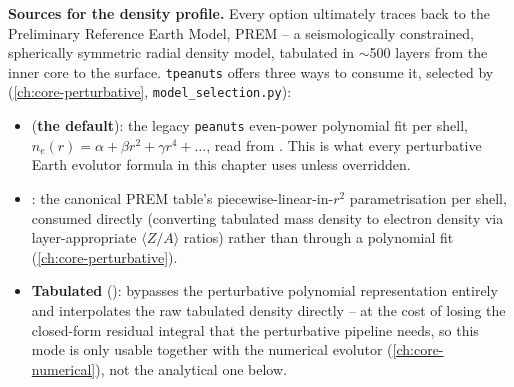 \begin{implbox}
\textbf{Sources for the density profile.} Every option ultimately traces
back to the Preliminary Reference Earth Model, PREM
\parencite{DziewonskiAnderson1981} -- a seismologically constrained,
spherically symmetric radial density model, tabulated in $\sim$500 layers
from the inner core to the surface. \texttt{tpeanuts} offers three ways to
consume it, selected by 
(\cref{ch:core-perturbative}, \texttt{model\_selection.py}):
\begin{itemize}
  \item {} (\textbf{the default}): the legacy
    \texttt{peanuts} even-power polynomial fit per shell,
    $n_e(r)=\alpha+\beta r^2+\gamma r^4+\dots$, read from
    . This is what every perturbative
    Earth evolutor formula in this chapter uses unless overridden.
  \item {}: the canonical PREM table's piecewise-linear-in-$r^2$
    parametrisation per shell, consumed directly (converting tabulated mass
    density to electron density via layer-appropriate $\langle Z/A\rangle$
    ratios) rather than through a polynomial fit
    (\cref{ch:core-perturbative}).
  \item \textbf{Tabulated} (): bypasses
    the perturbative polynomial representation entirely and interpolates the
    raw tabulated density directly -- at the cost of losing the closed-form
    residual integral that the perturbative pipeline needs, so this mode is
    only usable together with the numerical evolutor
    (\cref{ch:core-numerical}), not the analytical one below.
\end{itemize}
\end{implbox}

